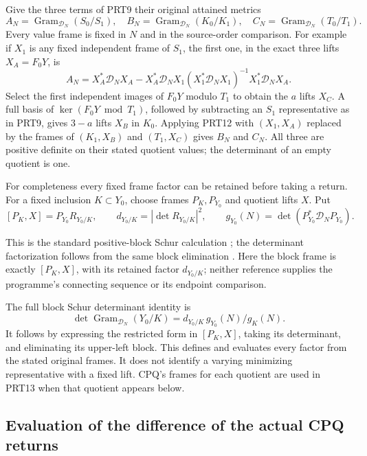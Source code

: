 Give the three terms of PRT9 their original attained metrics
\[
 A_N=\operatorname{Gram}_{\mathcal D_N}(S_0/S_1),\quad
 B_N=\operatorname{Gram}_{\mathcal D_N}(K_0/K_1),\quad
 C_N=\operatorname{Gram}_{\mathcal D_N}(T_0/T_1).
 \tag{PRT11}
\]
Every value frame is fixed in $N$ and in the source-order comparison.
For example if $X_1$ is any fixed independent frame of $S_1$, the first
one, in the exact three lifts $X_A=F_0Y$, is
\[
 A_N=X_A^*\mathcal D_NX_A-X_A^*\mathcal D_NX_1
 (X_1^*\mathcal D_NX_1)^{-1}X_1^*\mathcal D_NX_A.
 \tag{PRT12}
\]
Select the first independent images of $F_0Y$ modulo $T_1$ to obtain
the $a$ lifts $X_C$. A full basis of $\ker(F_0Y\bmod T_1)$, followed
by subtracting an $S_1$ representative as in PRT9, gives $3-a$
lifts $X_B$ in $K_0$. Applying PRT12 with $(X_1,X_A)$ replaced by
the frames of $(K_1,X_B)$ and $(T_1,X_C)$ gives $B_N$ and $C_N$.
All three are positive definite on their stated quotient values;
the determinant of an empty quotient is one.

For completeness every fixed frame factor can be retained before
taking a return. For a fixed inclusion $K\subset Y_0$, choose frames
$P_K,P_{Y_0}$ and quotient lifts $X$. Put
\[
 [P_K,X]=P_{Y_0}R_{Y_0/K},\qquad
 d_{Y_0/K}=|\det R_{Y_0/K}|^2,\qquad
 g_{Y_0}(N)=\det(P_{Y_0}^*\mathcal D_NP_{Y_0}).
 \tag{PRT13}
\]


This is the standard positive-block Schur calculation
\cite[\S2.1, (2.3)--(2.4)]{human:boyd1994}; the determinant
factorization follows from the same block elimination
\cite[p.~222, (6a)--(6b)]{human:hager1989}.
Here the block frame is exactly $[P_K,X]$, with its retained
factor $d_{Y_0/K}$; neither reference supplies the programme's
connecting sequence or its endpoint comparison.

The full block Schur determinant identity is
\[
 \det\operatorname{Gram}_{\mathcal D_N}(Y_0/K)
       =d_{Y_0/K}\,g_{Y_0}(N)/g_K(N).
 \tag{PRT14}
\]
It follows by expressing the restricted form in $[P_K,X]$,
taking its determinant, and eliminating its upper-left block.
This defines and evaluates every factor from the stated original
frames. It does not identify a varying minimizing representative
with a fixed lift. CPQ's frames for each quotient are used in
PRT13 when that quotient appears below.

\subsection{Evaluation of the difference of the actual CPQ returns}

